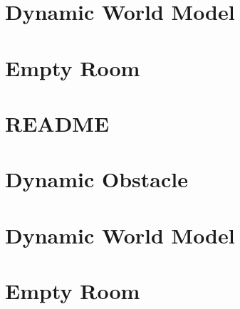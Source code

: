 \documentclass[twoside]{book}
\newcommand{\+}{\discretionary{\mbox{\scriptsize$\hookleftarrow$}}{}{}}
\begin{document}
\chapter{Dynamic World Model}
\label{md_smacc2_sm_reference_library_sm_dance_bot_models_dynamic_world_README}

\chapter{Empty Room}
\label{md_smacc2_sm_reference_library_sm_dance_bot_models_empty_room_README}

\chapter{README}
\label{md_smacc2_sm_reference_library_sm_dance_bot_README}

\chapter{Dynamic Obstacle}
\label{md_smacc2_sm_reference_library_sm_dance_bot_strikes_back_models_dynamic_obstacle_README}

\chapter{Dynamic World Model}
\label{md_smacc2_sm_reference_library_sm_dance_bot_strikes_back_models_dynamic_world_README}

\chapter{Empty Room}
\label{md_smacc2_sm_reference_library_sm_dance_bot_strikes_back_models_empty_room_README}

\end{document}
